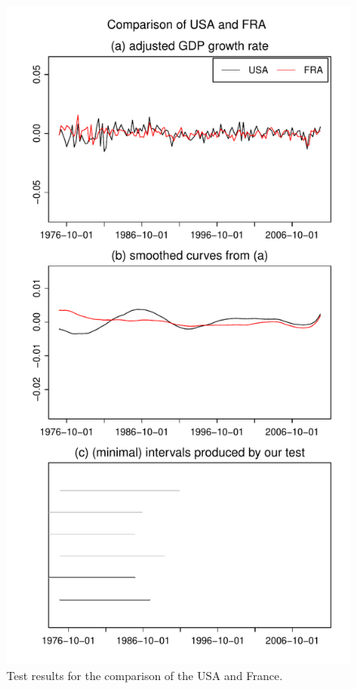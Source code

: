 \documentclass[a4paper,12pt]{article}
\begin{document}
\begin{figure}
\vspace{0.1cm}
\begin{minipage}[t]{0.24\textwidth}
\includegraphics[width=\textwidth]{output/plots/gdp/USA_vs_FRA}
\caption{Test results for the comparison of the USA and France.}\label{fig:USA:France}
\end{minipage}
\hspace{0.1cm}

\end{figure}
\end{document}
